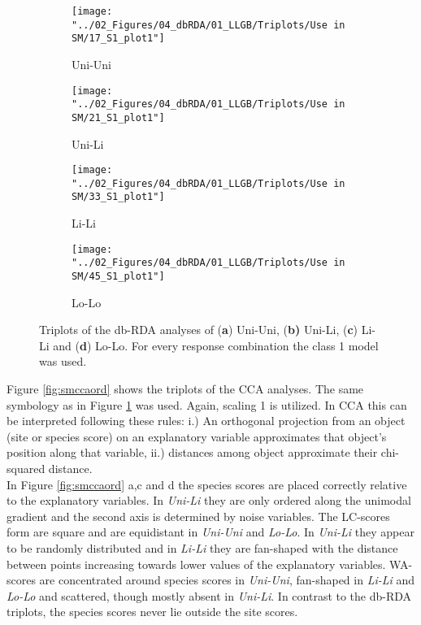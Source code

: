 		\begin{figure}[h!]
			
			\begin{subfigure}{0.5\textwidth}		
					\centering
					\texttt{[image: "../02\_Figures/04\_dbRDA/01\_LLGB/Triplots/Use in SM/17\_S1\_plot1"]}
					\caption{Uni-Uni}
			\end{subfigure}
			\begin{subfigure}{0.5\textwidth}
					\centering		
					\texttt{[image: "../02\_Figures/04\_dbRDA/01\_LLGB/Triplots/Use in SM/21\_S1\_plot1"]}
					\caption{Uni-Li}
			\end{subfigure}
			\begin{subfigure}{0.5\textwidth}	
					\centering	
					\texttt{[image: "../02\_Figures/04\_dbRDA/01\_LLGB/Triplots/Use in SM/33\_S1\_plot1"]}
					\caption{Li-Li}
			\end{subfigure}
			\begin{subfigure}{0.5\textwidth}		
					\centering
					\texttt{[image: "../02\_Figures/04\_dbRDA/01\_LLGB/Triplots/Use in SM/45\_S1\_plot1"]}
					\caption{Lo-Lo}
			\end{subfigure}
			
			\caption{Triplots of the db-RDA analyses of (\textbf{a}) Uni-Uni, (\textbf{b)} Uni-Li, (\textbf{c}) Li-Li and (\textbf{d}) Lo-Lo. For every response combination the class 1 model was used.}
			\label{fig:smdbord}
			
		\end{figure}
	
		
		Figure \ref{fig:smccaord} shows the triplots of the CCA analyses.
		The same symbology as in Figure \ref{fig:smdbord} was used.
		Again, scaling 1 is utilized.
		In CCA this can be interpreted following these rules: 
		i.) An orthogonal projection from an object (site or species score) on an explanatory variable approximates that object's position along that variable, ii.)  distances among object approximate their chi-squared distance. \\
		In Figure \ref{fig:smccaord} a,c and d the species scores are placed correctly relative to the explanatory variables. 
		In \textit{Uni-Li} they are only ordered along the unimodal gradient and the second axis is determined by noise variables.
		The LC-scores form are square and are equidistant in \textit{Uni-Uni} and \textit{Lo-Lo}. 
		In \textit{Uni-Li} they appear to be randomly distributed and in \textit{Li-Li} they are fan-shaped with the distance between points increasing towards lower values of the explanatory variables. 
		WA-scores are concentrated around species scores in \textit{Uni-Uni}, fan-shaped in \textit{Li-Li} and \textit{Lo-Lo} and scattered, though mostly absent in \textit{Uni-Li}. 
		In contrast to the db-RDA triplots, the species scores never lie outside the site scores. 
		
